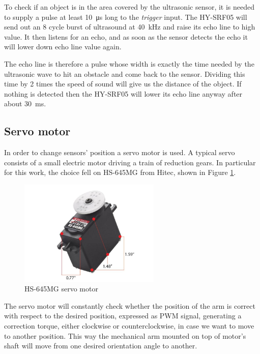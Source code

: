 To check if an object is in the area covered by the ultrasonic sensor, it is needed to supply a pulse at least \SI{10}{\micro\second} long to the {\em trigger} input. The HY-SRF05 will send out an 8 cycle burst of ultrasound at \SI{40}{\kilo\hertz} and raise its echo line to high value. It then listens for an echo, and as soon as the sensor detects the echo it will lower down echo line value again.

The echo line is therefore a pulse whose width is exactly the time needed by the ultrasonic wave to hit an obstacle and come back to the sensor. Dividing this time by 2 times the speed of sound will give us the distance of the object. If nothing is detected then the HY-SRF05 will lower its echo line anyway after about \SI{30}{\milli\second}.





\subsection{Servo motor}

In order to change sensors' position a servo motor is used. A typical servo consists of a small electric motor driving a train of reduction gears. In particular for this work, the choice fell on HS-645MG from Hitec, shown in Figure \ref{fig:motor}.

\begin{figure}[tp]
\centering
\includegraphics[width=0.6\textwidth,keepaspectratio]{img/hs-645mg.jpg}
\caption{HS-645MG servo motor}
\label{fig:motor}
\end{figure}

The servo motor will constantly check whether the position of the arm is correct with respect to the desired position, expressed as PWM signal, generating a correction torque, either clockwise or counterclockwise, in case we want to move to another position. This way the mechanical arm mounted on top of motor's shaft will move from one desired orientation angle to another.

